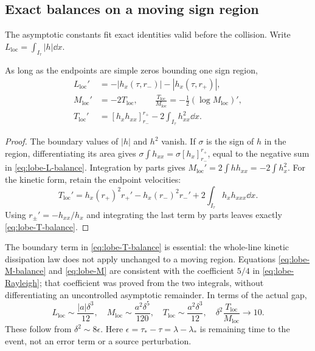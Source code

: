 \subsection{Exact balances on a moving sign region}
The asymptotic constants fit exact identities valid before the
collision. Write \(L_{\mathrm{loc}}=\int_{I_\tau}|h|\dd x\).
\begin{proposition}\label{prop:lobe-balance}
As long as the endpoints are simple zeros bounding one sign region,
\begin{align}
 L_{\mathrm{loc}}'&=-|h_x(\tau,r_-)|-|h_x(\tau,r_+)|,
 \label{eq:lobe-L-balance}\\
 M_{\mathrm{loc}}'&=-2T_{\mathrm{loc}},
 \qquad \frac{T_{\mathrm{loc}}}{M_{\mathrm{loc}}}
       =-\tfrac12(\log M_{\mathrm{loc}})',
 \label{eq:lobe-M-balance}\\
 T_{\mathrm{loc}}'&=[h_xh_{xx}]_{r_-}^{r_+}
             -2\int_{I_\tau}h_{xx}^2\dd x.
 \label{eq:lobe-T-balance}
\end{align}
\end{proposition}
\begin{proof}
The boundary values of \(|h|\) and \(h^2\) vanish. If \(\sigma\)
is the sign of \(h\) in the region, differentiating its area gives
\(\sigma\int h_{xx}=\sigma[h_x]_{r_-}^{r_+}\), equal to
the negative sum in \eqref{eq:lobe-L-balance}.
Integration by parts gives
\(M_{\mathrm{loc}}'=2\int hh_{xx}=-2\int h_x^2\).
For the kinetic form, retain the endpoint velocities:
\[
 T_{\mathrm{loc}}'=h_x(r_+)^2r_+'-h_x(r_-)^2r_-'
                       +2\int_{I_\tau}h_xh_{xxx}\dd x.
\]
Using \(r_\pm'=-h_{xx}/h_x\) and integrating the last term
by parts leaves exactly \eqref{eq:lobe-T-balance}.
\end{proof}

The boundary term in \eqref{eq:lobe-T-balance} is essential: the
whole-line kinetic dissipation law does not apply unchanged to a
moving region. Equations \eqref{eq:lobe-M-balance} and
\eqref{eq:lobe-M} are consistent with the coefficient \(5/4\)
in \eqref{eq:lobe-Rayleigh}; that coefficient was proved from the
two integrals, without differentiating an uncontrolled asymptotic
remainder. In terms of the actual gap,
\begin{equation}\label{eq:lobe-gap-scales}
 L_{\mathrm{loc}}\sim\frac{|a|\delta^3}{12},\quad
 M_{\mathrm{loc}}\sim\frac{a^2\delta^5}{120},\quad
 T_{\mathrm{loc}}\sim\frac{a^2\delta^3}{12},\quad
 \delta^2\frac{T_{\mathrm{loc}}}{M_{\mathrm{loc}}}\longrightarrow10.
\end{equation}
These follow from \(\delta^2\sim8\epsilon\). Here
\(\epsilon=\tau_*-\tau=\lambda-\lambda_*\) is remaining time
to the event, not an error term or a source perturbation.
